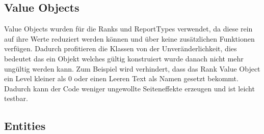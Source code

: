 
\subsection{Value Objects} %





Value Objects wurden für die Ranks und ReportTypes verwendet, da diese rein auf ihre Werte reduziert werden können und über keine zusätzlichen Funktionen verfügen.
Dadurch profitieren die Klassen von der Unveränderlichkeit, dies bedeutet das ein Objekt welches gültig konstruiert wurde danach nicht mehr ungültig werden kann.
Zum Beispiel wird verhindert, dass das Rank Value Object ein Level kleiner als 0 oder einen Leeren Text als Namen gesetzt bekommt.
Dadurch kann der Code weniger ungewollte Seiteneffekte erzeugen und ist leicht testbar.


\subsection{Entities}

